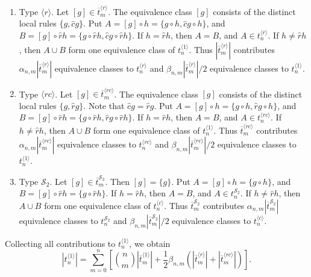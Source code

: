 \documentclass[a4paper]{article}
\begin{document}
\begin{enumerate}
\item Type $\langle r \rangle$.
Let $[g] \in \overline{t}^{\langle r \rangle}_m$.
The equivalence class $[g]$ consists of the distinct local rules
$ \{ g, \hat{c}g \}$.
Put $A = [g] \circ h = \{g \circ h, \hat{c}g \circ h \}$, and
$B = [g] \circ \hat{r}h = \{g \circ \hat{r}h, \hat{c}g \circ \hat{r}h \}$.
If $h = \hat{r}h$, then $A = B$, and $A \in t^{\langle r \rangle}_n$.
If $h \ne \hat{r}h$, then $A \cup B$ form one equivalence class of $t^{\langle 1\rangle}_n$.
Thus $|\overline{t}^{\langle r \rangle}_m|$
contributes $\alpha_{n,m} |\overline{t}^{\langle r \rangle}_m|$ equivalence classes to $t^{\langle r \rangle}_n$
and $\beta_{n,m}|\overline{t}^{\langle r \rangle}_m| / 2$ equivalence classes to $t^{\langle 1\rangle}_n$.

\item Type $\langle rc \rangle$.
Let $[g] \in \overline{t}^{\langle rc \rangle}_m$.
The equivalence class $[g]$ consists of the distinct local rules
$ \{ g, \hat{r}g \}$.
Note that $\hat{c}g = \hat{r}g$.
Put $A = [g] \circ h = \{g \circ h, \hat{r}g \circ h \}$, and
$B = [g] \circ \hat{r}h = \{g \circ \hat{r}h, \hat{r}g \circ \hat{r}h \}$.
If $h = \hat{r}h$, then $A = B$, and $A \in t^{\langle rc \rangle}_n$.
If $h \ne \hat{r}h$, then $A \cup B$ form one equivalence class of $t^{\langle 1\rangle}_n$.
Thus $\overline{t}^{\langle rc \rangle}_m$
contributes $\alpha_{n,m} |\overline{t}^{\langle rc \rangle}_m| $ equivalence classes to $t^{\langle rc \rangle}_n$
and $\beta_{n,m} |\overline{t}^{\langle rc \rangle}_m| / 2$ equivalence classes to $t^{\langle 1\rangle}_n$.

\item Type $\mathcal{S}_2$.
Let $[g] \in \overline{t}^{\mathcal{S}_2}_m$.
Then $[g] = \{ g \}$.
Put $A = [g] \circ h = \{g \circ h \}$, and
$B = [g] \circ \hat{r}h = \{g \circ \hat{r}h  \}$.
If $h = \hat{r}h$, then $A = B$, and $A \in t^{\mathcal{S}_2}_n$.
If $h \ne \hat{r}h$, then $A \cup B$ form one equivalence class of $t^{\langle c \rangle}_n$.
Thus $\overline{t}^{\mathcal{S}_2}_m$
contributes $\alpha_{n,m} |\overline{t}^{\mathcal{S}_2}_m|$ equivalence classes to $t^{\mathcal{S}_2}_n$
and $\beta_{n,m}  |\overline{t}^{\mathcal{S}_2}_m| / 2$ equivalence classes to $t^{\langle c \rangle}_n$.
\end{enumerate}
Collecting all contributions to $t^{\langle 1 \rangle}_n$, we obtain
\[
|t_n^{\langle 1 \rangle}| =
         \sum_{m=0}^{n} \left[ \binom{n}{m} |\overline{t}_m^{\langle 1 \rangle}|
        + \frac{1}{2} \beta_{n,m}  \left( |\overline{t}_m^{\langle r \rangle}|
        + |\overline{t}_m^{\langle rc \rangle}| \right) \right].
\]
\end{document}
